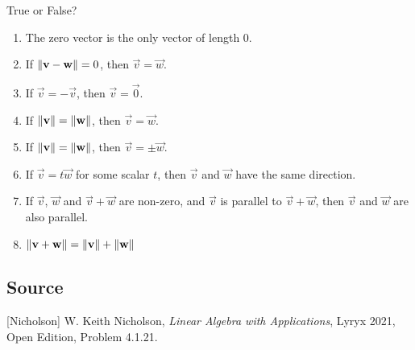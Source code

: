 \documentclass{ximera}
\author{}
\begin{document}
\begin{exercise}
True or False?

\begin{enumerate}
    \item The zero vector is the only vector of length 0.
    \begin{multipleChoice}
 \end{multipleChoice}
 \item If $\left\lVert\mathbf{v}-\mathbf{w}\right\rVert=0$, then $\vec{v}=\vec{w}$.
 \begin{multipleChoice}
 \end{multipleChoice}
 \item If $\vec{v}=-\vec{v}$, then $\vec{v}=\vec{0}$.
 \begin{multipleChoice}
 \end{multipleChoice}
 \item If $\left\lVert\mathbf{v}\right\rVert=\left\lVert\mathbf{w}\right\rVert$, then $\vec{v}=\vec{w}$.
 \begin{multipleChoice}
 \end{multipleChoice}
 \item If $\left\lVert\mathbf{v}\right\rVert=\left\lVert\mathbf{w}\right\rVert$, then $\vec{v}=\pm\vec{w}$.
 \begin{multipleChoice}
 \end{multipleChoice}
 \item If $\vec{v}=t\vec{w}$ for some scalar $t$, then $\vec{v}$ and $\vec{w}$ have the same direction.
  \begin{multipleChoice}
 \end{multipleChoice}
 \item If $\vec{v}$, $\vec{w}$ and $\vec{v}+\vec{w}$ are non-zero, and $\vec{v}$ is parallel to $\vec{v}+\vec{w}$, then $\vec{v}$ and $\vec{w}$ are also parallel.
 \begin{multipleChoice}
 \end{multipleChoice}
 \item $\left\lVert\mathbf{v}+\mathbf{w}\right\rVert=\left\lVert\mathbf{v}\right\rVert+\left\lVert\mathbf{w}\right\rVert$
 \begin{multipleChoice}
 \end{multipleChoice}
\end{enumerate}
 
\end{exercise}

\subsection*{Source}
[Nicholson] W. Keith Nicholson, {\it Linear Algebra with Applications}, Lyryx 2021, Open Edition, Problem 4.1.21.
\end{document}
